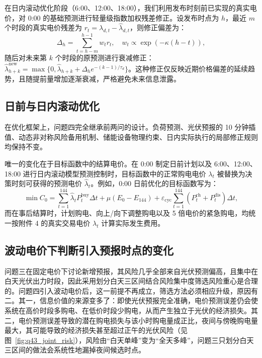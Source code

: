 \documentclass[withoutpreface,bwprint]{cumcmthesis}
\begin{document}
在日内滚动优化阶段（6:00、12:00、18:00），我们利用发布时刻前已实现的真实电价，对 0:00 的基础预测进行轻量级指数加权残差修正。设发布时点为 $h$，最近 $m$ 个时段的真实电价残差为 $r_{t} = \lambda_{d,t} - \hat{\lambda}_{d,t}$，则修正偏差为：
\begin{equation}
	\Delta_h = \sum_{t=h-m}^{h-1} w_t r_t, \quad w_t \propto \exp\left(-\kappa(h - t)\right),
	\label{eq:q4price_bias}
\end{equation}
随后对未来第 $k$ 个时段的原预测进行衰减修正：$\hat{\lambda}^{\mathrm{new}}_{h+k} = \max\{0, \hat{\lambda}_{h+k} + \Delta_h e^{-(k-1)/\tau_d}\}$。这种修正仅反映近期价格偏差的延续趋势，且随提前量增加逐渐衰减，严格避免未来信息泄露。

\subsection{日前与日内滚动优化}

在优化框架上，问题四完全继承前两问的设计。负荷预测、光伏预报的 10 分钟插值、动态非对称风险备用机制、储能设备物理约束、日内实际执行的局部修正规则均保持不变。

唯一的变化在于目标函数中的结算电价。在 0:00 制定日前计划以及 6:00、12:00、18:00 进行日内滚动模型预测控制时，目标函数中的正常购电电价 $\lambda_t$ 被替换为决策时刻可获得的预测电价 $\hat{\lambda}_t$。例如，0:00 日前优化的目标函数写为：
\begin{equation}
	\min C_0 = \sum_{t=1}^{144} \hat{\lambda}_t P^{\mathrm{buy}}_t \Delta t + \mu(E_0 - E_{144}) + \varepsilon_{\mathrm{cyc}} \sum_{t=1}^{144} (P^{\mathrm{ch}}_t + P^{\mathrm{dis}}_t) \Delta t,
	\label{eq:q4_obj}
\end{equation}
而在事后结算时，计划购电、向上/向下调整购电以及 5 倍电价的紧急购电，均统一按附件 4 的真实交易电价 $\lambda_t$ 计算实际发生费用。

\subsection{波动电价下判断引入预报时点的变化}

问题三在固定电价下讨论新增预报，其风险几乎全部来自光伏预测偏高，且集中在白天光伏出力时段，因此采用划分白天三区间结合风险集中度筛选风险重心是合理的。问题四引入波动电价后，这一前提不再成立，筛选方法必须相应升级，原因有二。其一，信息价值的来源变多了：即使光伏预报完全准确，电价预测误差仍会使系统在高价时段多购电、在低价时段少购电，从而产生独立于光伏的经济损失。其二，电价预测误差导致的潜在购电损失与该小时购电量成正比，夜间与傍晚购电量最大，其可能导致的经济损失甚至超过正午的光伏风险（见图~\ref{fig:q43_joint_risk}），风险由“白天单峰”变为“全天多峰”，问题三只划分白天三区间的做法会系统性地漏掉夜间候选时点。
\end{document}
